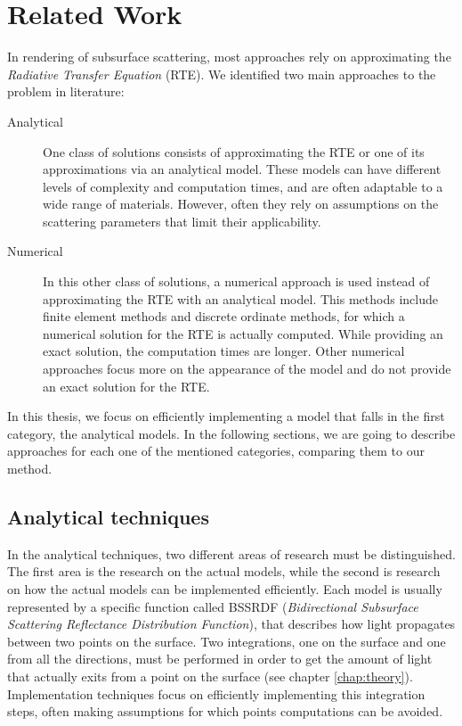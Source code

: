 \chapter{Related Work}
\label{chap:previous}
In rendering of subsurface scattering, most approaches rely on approximating the \emph{Radiative Transfer Equation} (RTE). We identified two main approaches to the problem in literature:

\begin{description}
	\item[Analytical] One class of solutions consists of approximating the RTE or one of its approximations via an analytical model. These models can have different levels of complexity and computation times, and are often adaptable to a wide range of materials. However, often they rely on assumptions on the scattering parameters that limit their applicability.
	\item[Numerical] In this other class of solutions, a numerical approach is used instead of approximating the RTE with an analytical model. This methods include finite element methods and discrete ordinate methods, for which a numerical solution for the RTE is actually computed. While providing an exact solution, the computation times are longer. Other numerical approaches focus more on the appearance of the model and do not provide an exact solution for the RTE.
\end{description}

In this thesis, we focus on efficiently implementing a model that falls in the first category, the analytical models. In the following sections, we are going to describe approaches for each one of the mentioned categories, comparing them to our method.

\section{Analytical techniques}

In the analytical techniques, two different areas of research must be distinguished. The first area is the research on the actual models, while the second is research on how the actual models can be implemented efficiently. Each model is usually represented by a specific function called BSSRDF (\emph{Bidirectional Subsurface Scattering Reflectance Distribution Function}), that describes how light propagates between two points on the surface. Two integrations, one on the surface and one from all the directions, must be performed in order to get the amount of light that actually exits from a point on the surface (see chapter \ref{chap:theory}). Implementation techniques focus on efficiently implementing this integration steps, often making assumptions for which points computations can be avoided. 


